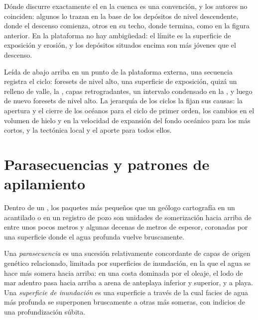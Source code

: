 Dónde discurre exactamente el  en la cuenca es una convención, y
los autores no coinciden: algunos lo trazan en la base de los depósitos de nivel descendente, donde
el descenso comienza, otros en su techo, donde termina, como en la figura anterior.
En la plataforma no hay ambigüedad: el límite es la superficie de exposición
y erosión, y los depósitos situados encima son más jóvenes que el descenso.

Leída de abajo arriba en un punto de la plataforma externa, una secuencia registra
el ciclo: foresets de nivel alto, una superficie de exposición, quizá un relleno de valle,
la , capas retrogradantes, un intervalo condensado en la
, y luego de nuevo foresets de nivel alto. La jerarquía de los
ciclos la fijan sus causas: la apertura y el cierre de los océanos para el
ciclo de primer orden, los cambios en el volumen de hielo y en la velocidad de
expansión del fondo oceánico para los más cortos, y la tectónica local y el aporte para todos
ellos.

\section{Parasecuencias y patrones de apilamiento}\label{sec:b3:sequence-stratigraphy:parasequences}

Dentro de un , los paquetes más pequeños que un geólogo cartografía en un acantilado o en un registro de pozo
son unidades de somerización hacia arriba de entre unos pocos metros y algunas decenas de metros de espesor,
coronadas por una superficie donde el agua profunda vuelve bruscamente.

\begin{definition}\label{def:b3:sequence-stratigraphy:parasequence}
Una \emph{parasecuencia} es una sucesión relativamente concordante
de capas de origen genético relacionado, limitada por superficies de inundación, en la que
el agua se hace más somera hacia arriba: en una costa dominada por el oleaje, el lodo de mar adentro pasa hacia arriba
a arena de anteplaya inferior y superior, y a playa. Una \emph{superficie de
inundación} es una superficie a través de la cual facies de agua más profunda se superponen bruscamente a otras más someras,
con indicios de una profundización súbita.
\end{definition}


